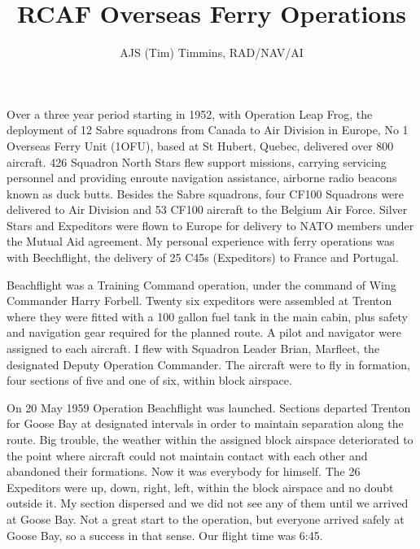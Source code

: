 %


\title{RCAF Overseas Ferry Operations}
\author{AJS (Tim) Timmins, RAD/NAV/AI}

\maketitle

Over a three year period starting in 1952, with Operation Leap Frog,
the deployment of 12 Sabre squadrons from Canada to Air Division in
Europe, No 1 Overseas Ferry Unit (1OFU), based at St Hubert, Quebec,
delivered over 800 aircraft. 426 Squadron North Stars flew support
missions, carrying servicing personnel and providing enroute
navigation assistance, airborne radio beacons known as duck
butts. Besides the Sabre squadrons, four CF100 Squadrons were
delivered to Air Division and 53 CF100 aircraft to the Belgium Air
Force. Silver Stars and Expeditors were flown to Europe for delivery
to NATO members under the Mutual Aid agreement. My personal experience
with ferry operations was with Beechflight, the delivery of 25 C45s
(Expeditors) to France and Portugal.

Beachflight was a Training Command operation, under the command of
Wing Commander Harry Forbell. Twenty six expeditors were assembled at
Trenton where they were fitted with a 100 gallon fuel tank in the main
cabin, plus safety and navigation gear required for the planned
route. A pilot and navigator were assigned to each aircraft. I flew
with Squadron Leader Brian, Marfleet, the designated Deputy Operation
Commander. The aircraft were to fly in formation, four sections of
five and one of six, within block airspace. 


On 20 May 1959 Operation Beachflight was launched. Sections departed
Trenton for Goose Bay at designated intervals in order to maintain
separation along the route. Big trouble, the weather within the
assigned block airspace deteriorated to the point where aircraft could
not maintain contact with each other and abandoned their
formations. Now it was everybody for himself. The 26 Expeditors were
up, down, right, left, within the block airspace and no doubt outside
it. My section dispersed and we did not see any of them until we
arrived at Goose Bay. Not a great start to the operation, but everyone
arrived safely at Goose Bay, so a success in that sense. Our flight
time was 6:45.

